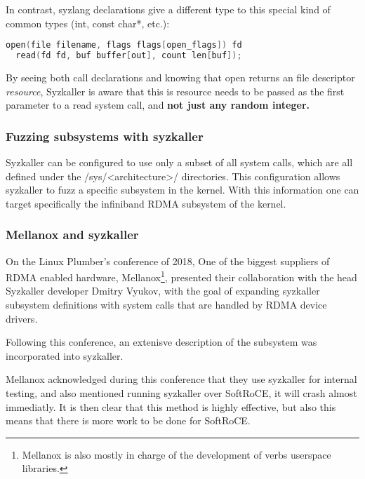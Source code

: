 In contrast, syzlang declarations give a different type to this special kind of common types (int, const char*, etc.):

\begin{lstlisting}[caption={syzlang definitions for open and read}, label={lst:syzlangdefs}, language=c]
  open(file filename, flags flags[open_flags]) fd
  read(fd fd, buf buffer[out], count len[buf]);
\end{lstlisting}

By seeing both call declarations and knowing that open returns an file descriptor \emph{resource}, Syzkaller is aware
that this is resource needs to be passed as the first parameter to a read system call, and \textbf{not just any random integer.}

\subsubsection{Fuzzing subsystems with syzkaller}

Syzkaller can be configured to use only a subset of all system calls, which are all defined under
the /sys/\textless architecture\textgreater/ directories. This configuration allows syzkaller to fuzz
a specific subsystem in the kernel. With this information one can target specifically
the infiniband RDMA subsystem of the kernel.


\subsubsection{Mellanox and syzkaller}

On the Linux Plumber's conference of 2018, One of the biggest suppliers of RDMA enabled hardware,
Mellanox\footnote{Mellanox is also mostly in charge of the development  of verbs userspace libraries.},
presented their collaboration with the head Syzkaller
developer Dmitry Vyukov, with the goal of expanding syzkaller subsystem definitions with system calls
that are handled by RDMA device drivers\cite{osherovichImprovingTestingRDMA2018}.

Following this conference, an extenisve description of the subsystem was incorporated into syzkaller.

Mellanox acknowledged during this conference that they use syzkaller for internal testing,
and also mentioned running syzkaller over SoftRoCE, it will crash almost immediatly. It is then clear
that this method is highly effective, but also this means that there is more work to be done
for SoftRoCE.


